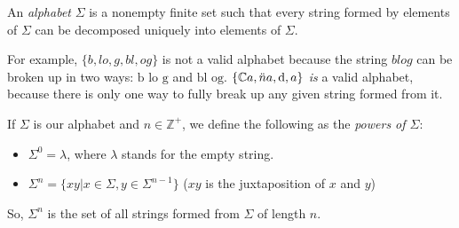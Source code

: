 \documentclass[12pt]{article}
\begin{document}
An \emph{alphabet} $\Sigma$ is a nonempty finite set such that every string formed by elements of $\Sigma$ can be decomposed uniquely into elements of $\Sigma$.

For example, $\{b,lo,g,bl,og\}$
is not a valid alphabet because the string $blog$ can be broken up in two ways: $\mbox{b lo g}$ and $\mbox{bl og}$.
$\{\mathbb{C}a,\ddot{n}a,{\rm d},a\}$ \emph{is} a valid alphabet, because there
is only one way to fully break up any given string formed from it.

If $\Sigma$ is our alphabet and $n \in \mathbb{Z}^+$,
we define the following as the \emph{powers of $\Sigma$}:
\begin{itemize}
\item $\Sigma^0 = {\lambda }$, where $\lambda$ stands for the empty string.
\item $\Sigma^n = \{xy|x \in \Sigma, y \in \Sigma^{n-1}\}$ ($xy$ is the juxtaposition of $x$ and $y$)
\end{itemize}

So, $\Sigma^n$ is the set of all strings formed from $\Sigma$ of length $n$.
\end{document}
